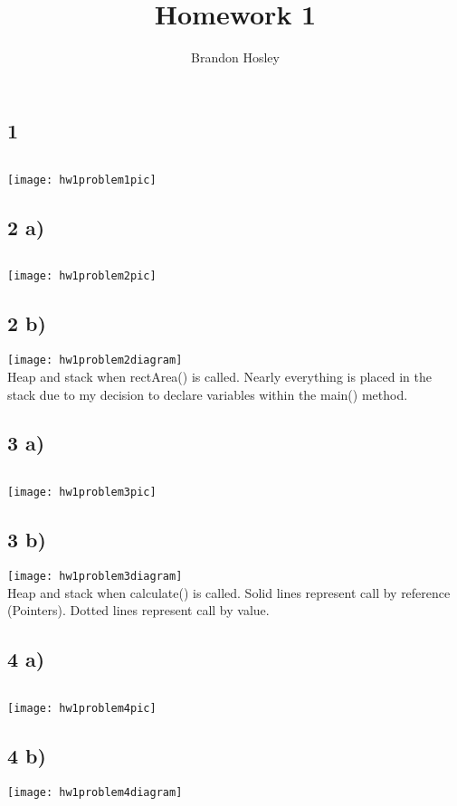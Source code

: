 \documentclass[a4paper,man,natbib]{apa6}
\title{Homework 1}
\author{Brandon Hosley}
\affiliation{Mike Davis}
\begin{document}
	\maketitle
		
	\subsection{1}
	\singlespacing
	\inputminted{c++}{./SourceCode/problem1.cpp}
	\texttt{[image: hw1problem1pic]}
	\doublespacing
	
	\subsection{2 a)}
	\singlespacing
	\inputminted{c++}{./SourceCode/problem2.cpp}
	\texttt{[image: hw1problem2pic]}
	\doublespacing
	\subsection{2 b)}
	\texttt{[image: hw1problem2diagram]} \\
	Heap and stack when rectArea() is called.
	Nearly everything is placed in the stack due to my decision to declare variables within the main() method.
	
	\subsection{3 a)}
	\singlespacing
	\inputminted{c++}{./SourceCode/problem3.cpp}
	\doublespacing
	\texttt{[image: hw1problem3pic]}
	\subsection{3 b)}
	\texttt{[image: hw1problem3diagram]} \\
	Heap and stack when calculate() is called.
	Solid lines represent call by reference (Pointers).
	Dotted lines represent call by value.
	
	\subsection{4 a)}
	\singlespacing
	\inputminted{c++}{./SourceCode/problem4.cpp}
	\texttt{[image: hw1problem4pic]}
	\doublespacing
	\subsection{4 b)}
	\texttt{[image: hw1problem4diagram]} \\
	
	\newpage
	\nocite{warford10}
	
	
\end{document}
